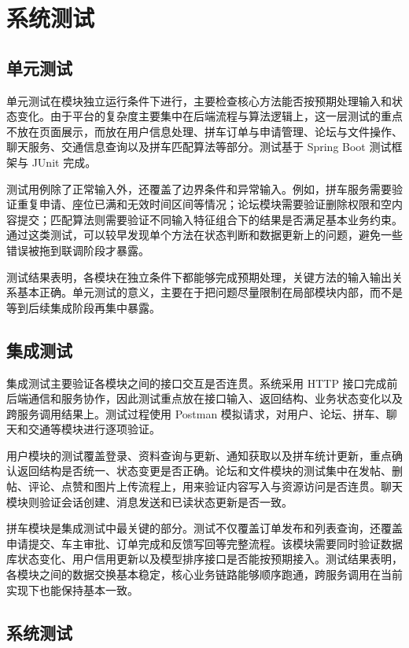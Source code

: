 ﻿\chapter{系统测试}\label{chap:test}

\section{单元测试}

单元测试在模块独立运行条件下进行，主要检查核心方法能否按预期处理输入和状态变化。由于平台的复杂度主要集中在后端流程与算法逻辑上，这一层测试的重点不放在页面展示，而放在用户信息处理、拼车订单与申请管理、论坛与文件操作、聊天服务、交通信息查询以及拼车匹配算法等部分。测试基于 Spring Boot 测试框架与 JUnit 完成。

测试用例除了正常输入外，还覆盖了边界条件和异常输入。例如，拼车服务需要验证重复申请、座位已满和无效时间区间等情况；论坛模块需要验证删除权限和空内容提交；匹配算法则需要验证不同输入特征组合下的结果是否满足基本业务约束。通过这类测试，可以较早发现单个方法在状态判断和数据更新上的问题，避免一些错误被拖到联调阶段才暴露。

测试结果表明，各模块在独立条件下都能够完成预期处理，关键方法的输入输出关系基本正确。单元测试的意义，主要在于把问题尽量限制在局部模块内部，而不是等到后续集成阶段再集中暴露。


\section{集成测试}

集成测试主要验证各模块之间的接口交互是否连贯。系统采用 HTTP 接口完成前后端通信和服务协作，因此测试重点放在接口输入、返回结构、业务状态变化以及跨服务调用结果上。测试过程使用 Postman 模拟请求，对用户、论坛、拼车、聊天和交通等模块进行逐项验证。

用户模块的测试覆盖登录、资料查询与更新、通知获取以及拼车统计更新，重点确认返回结构是否统一、状态变更是否正确。论坛和文件模块的测试集中在发帖、删帖、评论、点赞和图片上传流程上，用来验证内容写入与资源访问是否连贯。聊天模块则验证会话创建、消息发送和已读状态更新是否一致。

拼车模块是集成测试中最关键的部分。测试不仅覆盖订单发布和列表查询，还覆盖申请提交、车主审批、订单完成和反馈写回等完整流程。该模块需要同时验证数据库状态变化、用户信用更新以及模型排序接口是否能按预期接入。测试结果表明，各模块之间的数据交换基本稳定，核心业务链路能够顺序跑通，跨服务调用在当前实现下也能保持基本一致。


\section{系统测试}


